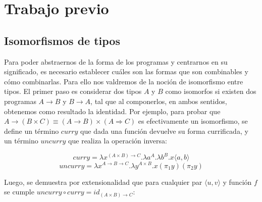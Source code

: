 \section{Trabajo previo}
\subsection{Isomorfismos de tipos}

Para poder abstraernos de la forma de los programas y centrarnos en su significado, es necesario establecer cuáles son las formas que son combinables y cómo combinarlas.
Para ello nos valdremos de la noción de isomorfismo entre tipos.
El primer paso es considerar dos tipos $A$ y $B$ como isomorfos si existen dos programas $A \rightarrow B$ y $B \rightarrow A$, tal que al componerlos, en ambos sentidos, obtenemos como resultado la identidad.
Por ejemplo, para probar que $A \rightarrow (B \times C) \equiv (A \rightarrow B) \times (A \Rightarrow C)$ es efectivamente un isomorfismo, se define un término $curry$ que dada una función devuelve su forma currificada, y un término $uncurry$ que realiza la operación inversa:

\[ curry = \lambda x^{(A \times B) \rightarrow C}. \lambda a^A . \lambda b^B . x\langle a,b \rangle \]
\[ uncurry = \lambda x^{A \rightarrow B \rightarrow C}. \lambda y^{A \times B} . x(\pi_1 y)(\pi_2 y) \]

Luego, se demuestra por extensionalidad que para cualquier par $\langle u,v \rangle$ y función $f$ se cumple $uncurry \circ curry = id_{(A \times B) \rightarrow C}$:

